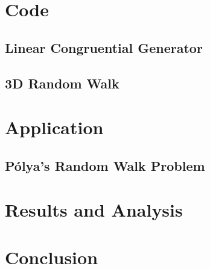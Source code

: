 \documentclass{article}
\begin{document}
\section{Code}

\subsection{Linear Congruential Generator}

\subsection{3D Random Walk}

\section{Application}

\subsection{P\'olya's Random Walk Problem}

\section{Results and Analysis}

\section{Conclusion}
\end{document}
